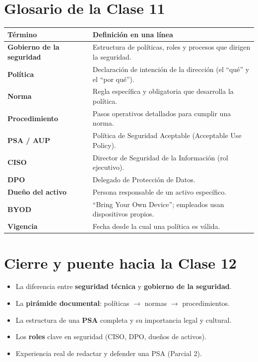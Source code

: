 \documentclass[12pt,a4paper]{article}
\renewcommand{\arraystretch}{1.25}
\begin{document}
\newpage
\section{Glosario de la Clase 11}

\renewcommand{\arraystretch}{1.4}
\begin{tabularx}{\textwidth}{>{\bfseries}p{4.5cm}X}
\toprule
\textbf{T\'ermino} & \textbf{Definici\'on en una l\'inea} \\
\midrule
Gobierno de la seguridad & Estructura de pol\'iticas, roles y procesos que dirigen la seguridad. \\
Pol\'itica & Declaraci\'on de intenci\'on de la direcci\'on (el ``qu\'e'' y el ``por qu\'e''). \\
Norma & Regla espec\'ifica y obligatoria que desarrolla la pol\'itica. \\
Procedimiento & Pasos operativos detallados para cumplir una norma. \\
PSA / AUP & Pol\'itica de Seguridad Aceptable (Acceptable Use Policy). \\
CISO & Director de Seguridad de la Informaci\'on (rol ejecutivo). \\
DPO & Delegado de Protecci\'on de Datos. \\
Due\~no del activo & Persona responsable de un activo espec\'ifico. \\
BYOD & ``Bring Your Own Device''; empleados usan dispositivos propios. \\
Vigencia & Fecha desde la cual una pol\'itica es v\'alida. \\
\bottomrule
\end{tabularx}

\vspace{1cm}

\section{Cierre y puente hacia la Clase 12}

\begin{cajaGobierno}[title={Lo que nos llevamos de la Clase 11}]
\begin{itemize}[leftmargin=2em]
    \item La diferencia entre \textbf{seguridad t\'ecnica} y \textbf{gobierno de la seguridad}.
    \item La \textbf{pir\'amide documental}: pol\'iticas $\rightarrow$ normas $\rightarrow$ procedimientos.
    \item La estructura de una \textbf{PSA} completa y su importancia legal y cultural.
    \item Los \textbf{roles} clave en seguridad (CISO, DPO, due\~nos de activos).
    \item Experiencia real de redactar y defender una PSA (Parcial 2).
\end{itemize}
\end{cajaGobierno}
\end{document}
